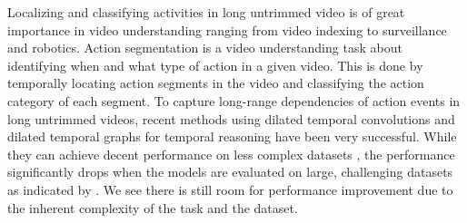 Localizing and classifying activities in long untrimmed video is of great importance in video understanding ranging from video indexing to surveillance and robotics. Action segmentation is a video understanding task about identifying when and what type of action in a given video. This is done by temporally locating action segments in the video and classifying the action category of each segment. To capture long-range dependencies of action events in long untrimmed videos, recent methods using dilated temporal convolutions \cite{8953830,9186840} and dilated temporal graphs for temporal reasoning \cite{graphbased2020,wang2020temporal} have been very successful. While they can achieve decent performance on less complex datasets \cite{Ishikawa_2021_WACV}, the performance significantly drops when the models are evaluated on large, challenging datasets as indicated by . We see there is still room for performance improvement due to the inherent complexity of the task and the dataset.


